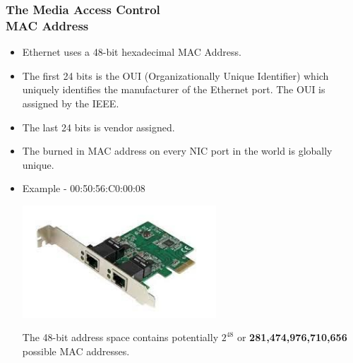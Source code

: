 \documentclass[pdflatex,compress]{beamer}
\begin{document}
\begin{frame}
	\frametitle{The Media Access Control\\ MAC Address}
	\begin{itemize}
		\item Ethernet uses a 48-bit hexadecimal MAC Address.
		\item The first 24 bits is the OUI (Organizationally Unique Identifier) which uniquely identifies the manufacturer of the Ethernet port. The OUI is assigned by the IEEE.
		\item The last 24 bits is vendor assigned.
		\item The burned in MAC address on every NIC port in the world is globally unique.
		\item Example - 00:50:56:C0:00:08
		\begin{multicols}{2}
			\begin{center}
				\includegraphics[width=0.8\linewidth]{img/img03}
			\end{center}
			\columnbreak
			The 48-bit address space contains potentially $ 2^48 $ or \textbf{281,474,976,710,656}
			possible MAC addresses.
		\end{multicols}
	\end{itemize}
\end{frame}
\end{document}
